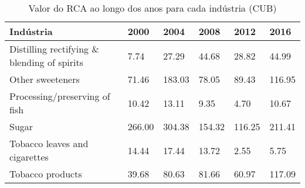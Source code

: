 \begin{table}
\centering
\caption{Valor do RCA ao longo dos anos para cada indústria (CUB)}
\label{tab:ex3-tempo-CUB}
\begin{tabular}{p{6cm}p{1.5cm}p{1.5cm}p{1.5cm}p{1.5cm}p{1.5cm}}
\toprule
                                  Indústria &   2000 &   2004 &   2008 &   2012 &   2016 \\
\midrule
Distilling rectifying \& blending of spirits &   7.74 &  27.29 &  44.68 &  28.82 &  44.99 \\
                           Other sweeteners &  71.46 & 183.03 &  78.05 &  89.43 & 116.95 \\
              Processing/preserving of fish &  10.42 &  13.11 &   9.35 &   4.70 &  10.67 \\
                                      Sugar & 266.00 & 304.38 & 154.32 & 116.25 & 211.41 \\
              Tobacco leaves and cigarettes &  14.44 &  17.44 &  13.72 &   2.55 &   5.75 \\
                           Tobacco products &  39.68 &  80.63 &  81.66 &  60.97 & 117.09 \\
\bottomrule
\end{tabular}
\end{table}

